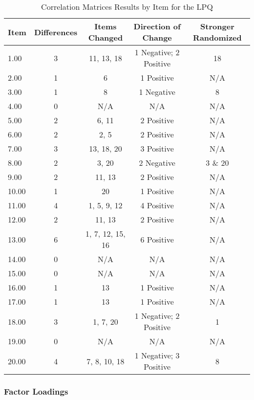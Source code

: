 \documentclass[english,man, mask]{apa6}
\theoremstyle{definition}
\theoremstyle{definition}
\theoremstyle{definition}
\theoremstyle{remark}
\begin{document}
\begin{table}[tbp]
\begin{center}
\begin{threeparttable}
\caption{\label{tab:cor-table-lpq}Correlation Matrices Results by Item for the LPQ}
\small{
\begin{tabular}{lcccc}
\toprule
Item & Differences & Items Changed & Direction of Change & Stronger Randomized\\
\midrule
1.00 & 3 & 11, 13, 18 & 1 Negative; 2 Positive & 18\\
2.00 & 1 & 6 & 1 Positive & N/A\\
3.00 & 1 & 8 & 1 Negative & 8\\
4.00 & 0 & N/A & N/A & N/A\\
5.00 & 2 & 6, 11 & 2 Positive & N/A\\
6.00 & 2 & 2, 5 & 2 Positive & N/A\\
7.00 & 3 & 13, 18, 20 & 3 Positive & N/A\\
8.00 & 2 & 3, 20 & 2 Negative & 3 \& 20\\
9.00 & 2 & 11, 13 & 2 Positive & N/A\\
10.00 & 1 & 20 & 1 Positive & N/A\\
11.00 & 4 & 1, 5, 9, 12 & 4 Positive & N/A\\
12.00 & 2 & 11, 13 & 2 Positive & N/A\\
13.00 & 6 & 1, 7, 12, 15, 16 & 6 Positive & N/A\\
14.00 & 0 & N/A & N/A & N/A\\
15.00 & 0 & N/A & N/A & N/A\\
16.00 & 1 & 13 & 1 Positive & N/A\\
17.00 & 1 & 13 & 1 Positive & N/A\\
18.00 & 3 & 1, 7, 20 & 1 Negative; 2 Positive & 1\\
19.00 & 0 & N/A & N/A & N/A\\
20.00 & 4 & 7, 8, 10, 18 & 1 Negative; 3 Positive & 8\\
\bottomrule
\end{tabular}
}
\end{threeparttable}
\end{center}
\end{table}

\subsubsection{Factor Loadings}\label{factor-loadings-1}
\end{document}

